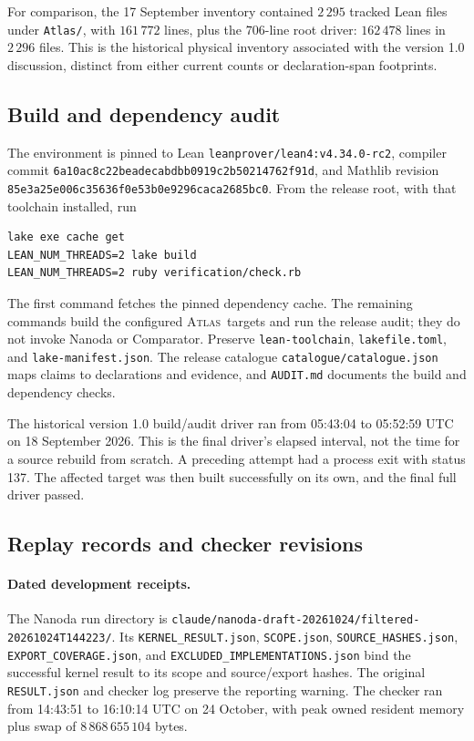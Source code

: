 \documentclass[11pt]{article}
\numberwithin{equation}{section}
\theoremstyle{definition}
\newcommand{\atlas}{\textsc{Atlas}}
\newcommand{\code}[1]{\texttt{\small #1}}
\newcommand{\leanname}[1]{{\small\nolinkurl{#1}}}
\begin{document}
For comparison, the 17 September inventory contained $2\,295$ tracked
Lean files under \code{Atlas/}, with $161\,772$ lines, plus the
$706$-line root driver: $162\,478$ lines in $2\,296$ files. This is the
historical physical inventory associated with the version 1.0 discussion,
distinct from either current counts or declaration-span footprints.


\subsection{Build and dependency audit}

The environment is pinned to Lean \code{leanprover/lean4:v4.34.0-rc2},
compiler commit
\leanname{6a10ac8c22beadecabdbb0919c2b50214762f91d}, and Mathlib revision
\leanname{85e3a25e006c35636f0e53b0e9296caca2685bc0}.
From the release root, with that toolchain installed, run
\begin{verbatim}
lake exe cache get
LEAN_NUM_THREADS=2 lake build
LEAN_NUM_THREADS=2 ruby verification/check.rb
\end{verbatim}
The first command fetches the pinned dependency cache. The remaining
commands build the configured \atlas\ targets and run the release
audit; they do not invoke Nanoda or Comparator. Preserve
\code{lean-toolchain}, \code{lakefile.toml}, and \code{lake-manifest.json}.
The release catalogue \leanname{catalogue/catalogue.json} maps claims
to declarations and evidence, and \code{AUDIT.md} documents the build
and dependency checks.

The historical version 1.0 build/audit driver ran from 05:43:04 to
05:52:59 UTC on 18 September 2026. This is the final driver's elapsed
interval, not the time for a source rebuild from scratch. A preceding
attempt had a process exit with status 137. The affected target was
then built successfully on its own, and the final full driver passed.

\subsection{Replay records and checker revisions}\label{app:replays}

\paragraph{Dated development receipts.}
The Nanoda run directory is
\leanname{claude/nanoda-draft-20261024/filtered-20261024T144223/}.
Its \leanname{KERNEL_RESULT.json}, \leanname{SCOPE.json},
\leanname{SOURCE_HASHES.json}, \leanname{EXPORT_COVERAGE.json}, and
\leanname{EXCLUDED_IMPLEMENTATIONS.json} bind the successful kernel
result to its scope and source/export hashes. The original
\leanname{RESULT.json} and checker log preserve the reporting warning.
The checker ran from 14:43:51 to 16:10:14 UTC on 24 October, with peak
owned resident memory plus swap of $8\,868\,655\,104$ bytes.
\end{document}
